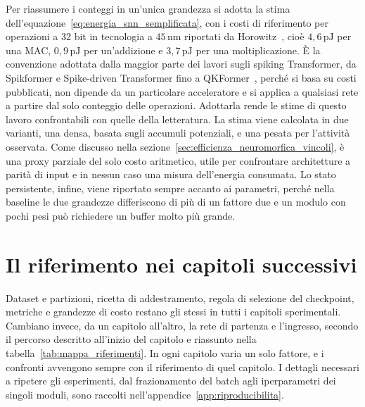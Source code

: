 Per riassumere i conteggi in un'unica grandezza si adotta la stima dell'equazione~\eqref{eq:energia_snn_semplificata}, con i costi di riferimento per operazioni a 32 bit in tecnologia a $45\,\mathrm{nm}$ riportati da Horowitz~\cite{horowitz2014energy}, cioè $4{,}6\,\mathrm{pJ}$ per una MAC, $0{,}9\,\mathrm{pJ}$ per un'addizione e $3{,}7\,\mathrm{pJ}$ per una moltiplicazione. È la convenzione adottata dalla maggior parte dei lavori sugli spiking Transformer, da Spikformer e Spike-driven Transformer fino a QKFormer~\cite{zhou2023spikformer,yao2023spikedriven,zhou2024qkformer}, perché si basa su costi pubblicati, non dipende da un particolare acceleratore e si applica a qualsiasi rete a partire dal solo conteggio delle operazioni. Adottarla rende le stime di questo lavoro confrontabili con quelle della letteratura. La stima viene calcolata in due varianti, una densa, basata sugli accumuli potenziali, e una pesata per l'attività osservata. Come discusso nella sezione~\ref{sec:efficienza_neuromorfica_vincoli}, è una proxy parziale del solo costo aritmetico, utile per confrontare architetture a parità di input e in nessun caso una misura dell'energia consumata. Lo stato persistente, infine, viene riportato sempre accanto ai parametri, perché nella baseline le due grandezze differiscono di più di un fattore due e un modulo con pochi pesi può richiedere un buffer molto più grande.



\section{Il riferimento nei capitoli successivi}
\label{sec:sintesi_protocollo}

Dataset e partizioni, ricetta di addestramento, regola di selezione del checkpoint, metriche e grandezze di costo restano gli stessi in tutti i capitoli sperimentali. Cambiano invece, da un capitolo all'altro, la rete di partenza e l'ingresso, secondo il percorso descritto all'inizio del capitolo e riassunto nella tabella~\ref{tab:mappa_riferimenti}. In ogni capitolo varia un solo fattore, e i confronti avvengono sempre con il riferimento di quel capitolo. I dettagli necessari a ripetere gli esperimenti, dal frazionamento del batch agli iperparametri dei singoli moduli, sono raccolti nell'appendice~\ref{app:riproducibilita}.

